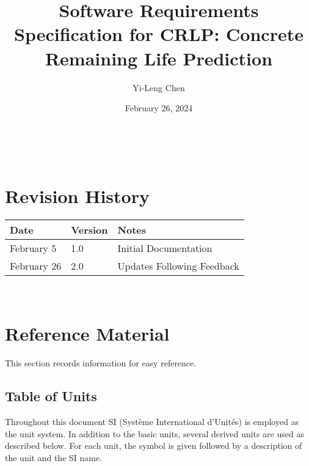 \documentclass[12pt]{article}
\begin{document}
\title{Software Requirements Specification for CRLP: Concrete Remaining Life Prediction} 
\author{Yi-Leng Chen}
\date{February 26, 2024}
	
\maketitle


\tableofcontents

~\newpage

\section*{Revision History}

\begin{tabularx}{\textwidth}{p{3cm}p{2cm}X}
\toprule {\bf Date} & {\bf Version} & {\bf Notes}\\
\midrule
February 5 & 1.0 & Initial Documentation\\
February 26 & 2.0 & Updates Following Feedback\\
\bottomrule
\end{tabularx}

~\newpage

\section{Reference Material}

This section records information for easy reference.

\subsection{Table of Units}

Throughout this document SI (Syst\`{e}me International d'Unit\'{e}s) is employed as the unit system.  In addition to the basic units, several derived units are used as described below.  For each unit, the symbol is given followed by a description of the unit and the SI name.
~\newline
\end{document}
